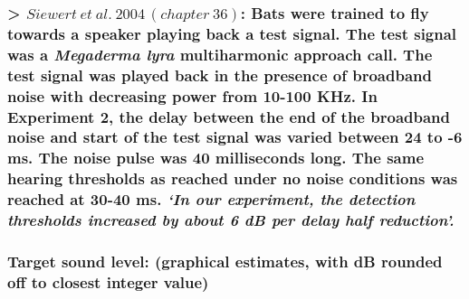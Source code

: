 \documentclass[11pt]{article}
\begin{document}
{\subsubsection{\texorpdfstring{\textgreater{}
\href{http://press.uchicago.edu/ucp/books/book/chicago/E/bo3612864.html}{\(Siewert\ et\ al.\ 2004\, (chapter\ 36)\)}:
Bats were trained to fly towards a speaker playing back a test signal.
The test signal was a \emph{Megaderma lyra} multiharmonic approach call.
The test signal was played back in the presence of broadband noise with
decreasing power from 10-100 KHz. In Experiment 2, the delay between the
end of the broadband noise and start of the test signal was varied
between 24 to -6 ms. The noise pulse was 40 milliseconds long. The same
hearing thresholds as reached under no noise conditions was reached at
30-40 ms. \emph{`In our experiment, the detection thresholds increased
by about 6 dB per delay half
reduction'.}}{\textgreater{} Siewert\textbackslash{} et\textbackslash{} al.\textbackslash{} 2004\textbackslash{}, (chapter\textbackslash{} 36): Bats were trained to fly towards a speaker playing back a test signal. The test signal was a Megaderma lyra multiharmonic approach call. The test signal was played back in the presence of broadband noise with decreasing power from 10-100 KHz. In Experiment 2, the delay between the end of the broadband noise and start of the test signal was varied between 24 to -6 ms. The noise pulse was 40 milliseconds long. The same hearing thresholds as reached under no noise conditions was reached at 30-40 ms. `In our experiment, the detection thresholds increased by about 6 dB per delay half reduction'.}}\label{siewert-et-al.-2004-chapter-36-bats-were-trained-to-fly-towards-a-speaker-playing-back-a-test-signal.-the-test-signal-was-a-megaderma-lyra-multiharmonic-approach-call.-the-test-signal-was-played-back-in-the-presence-of-broadband-noise-with-decreasing-power-from-10-100-khz.-in-experiment-2-the-delay-between-the-end-of-the-broadband-noise-and-start-of-the-test-signal-was-varied-between-24-to--6-ms.-the-noise-pulse-was-40-milliseconds-long.-the-same-hearing-thresholds-as-reached-under-no-noise-conditions-was-reached-at-30-40-ms.-in-our-experiment-the-detection-thresholds-increased-by-about-6-db-per-delay-half-reduction.}}

\hypertarget{target-sound-level-graphical-estimates-with-db-rounded-off-to-closest-integer-value}{%
\subsubsection{Target sound level: (graphical estimates, with dB rounded
off to closest integer
value)}\label{target-sound-level-graphical-estimates-with-db-rounded-off-to-closest-integer-value}}
\end{document}

